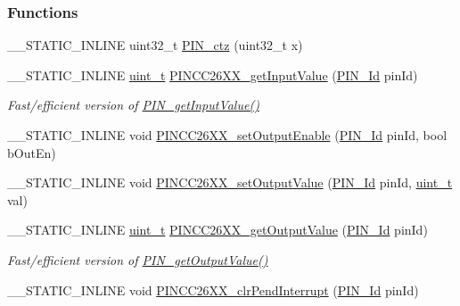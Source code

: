 \subsubsection*{Functions}
\begin{DoxyCompactItemize}
\item 
\+\_\+\+\_\+\+S\+T\+A\+T\+I\+C\+\_\+\+I\+N\+L\+I\+N\+E uint32\+\_\+t \hyperlink{_p_i_n_c_c26_x_x_8h_a94ac62e1f4e034d392ef5827bb2ab763}{P\+I\+N\+\_\+ctz} (uint32\+\_\+t x)
\item 
\+\_\+\+\_\+\+S\+T\+A\+T\+I\+C\+\_\+\+I\+N\+L\+I\+N\+E \hyperlink{_p_i_n_8h_a12a1e9b3ce141648783a82445d02b58d}{uint\+\_\+t} \hyperlink{_p_i_n_c_c26_x_x_8h_a08ed2ad0cefced9fb2224edf5a040be5}{P\+I\+N\+C\+C26\+X\+X\+\_\+get\+Input\+Value} (\hyperlink{_p_i_n_8h_a9ae8197f460bb76ea09a84f47d09921f}{P\+I\+N\+\_\+\+Id} pin\+Id)
\begin{DoxyCompactList}\small\item\em Fast/efficient version of \hyperlink{_p_i_n_8h_a9bfcc2ddeaaac6dcd90d31ff0c125f3d}{P\+I\+N\+\_\+get\+Input\+Value()} \end{DoxyCompactList}\item 
\+\_\+\+\_\+\+S\+T\+A\+T\+I\+C\+\_\+\+I\+N\+L\+I\+N\+E void \hyperlink{_p_i_n_c_c26_x_x_8h_acd27e505982c7ece583d405d6d9f6027}{P\+I\+N\+C\+C26\+X\+X\+\_\+set\+Output\+Enable} (\hyperlink{_p_i_n_8h_a9ae8197f460bb76ea09a84f47d09921f}{P\+I\+N\+\_\+\+Id} pin\+Id, bool b\+Out\+En)
\item 
\+\_\+\+\_\+\+S\+T\+A\+T\+I\+C\+\_\+\+I\+N\+L\+I\+N\+E void \hyperlink{_p_i_n_c_c26_x_x_8h_a97732e0803b68d0094930bfcc04e53c6}{P\+I\+N\+C\+C26\+X\+X\+\_\+set\+Output\+Value} (\hyperlink{_p_i_n_8h_a9ae8197f460bb76ea09a84f47d09921f}{P\+I\+N\+\_\+\+Id} pin\+Id, \hyperlink{_p_i_n_8h_a12a1e9b3ce141648783a82445d02b58d}{uint\+\_\+t} val)
\item 
\+\_\+\+\_\+\+S\+T\+A\+T\+I\+C\+\_\+\+I\+N\+L\+I\+N\+E \hyperlink{_p_i_n_8h_a12a1e9b3ce141648783a82445d02b58d}{uint\+\_\+t} \hyperlink{_p_i_n_c_c26_x_x_8h_a487a8fe91cce4d7121897be4fb6534cf}{P\+I\+N\+C\+C26\+X\+X\+\_\+get\+Output\+Value} (\hyperlink{_p_i_n_8h_a9ae8197f460bb76ea09a84f47d09921f}{P\+I\+N\+\_\+\+Id} pin\+Id)
\begin{DoxyCompactList}\small\item\em Fast/efficient version of \hyperlink{_p_i_n_8h_a4a05603f0e075a37af59ed66fd6c6443}{P\+I\+N\+\_\+get\+Output\+Value()} \end{DoxyCompactList}\item 
\+\_\+\+\_\+\+S\+T\+A\+T\+I\+C\+\_\+\+I\+N\+L\+I\+N\+E void \hyperlink{_p_i_n_c_c26_x_x_8h_a9e8be001ff8ca9946dce5668685befae}{P\+I\+N\+C\+C26\+X\+X\+\_\+clr\+Pend\+Interrupt} (\hyperlink{_p_i_n_8h_a9ae8197f460bb76ea09a84f47d09921f}{P\+I\+N\+\_\+\+Id} pin\+Id)

\end{DoxyCompactItemize}
